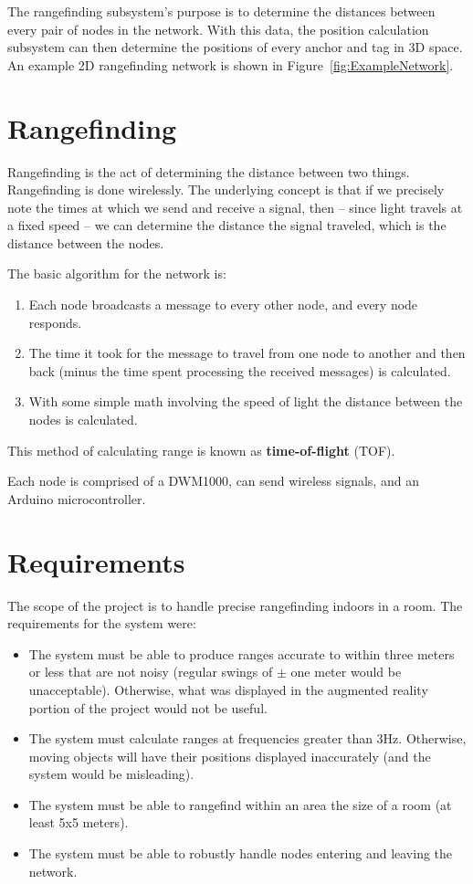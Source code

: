 The rangefinding subsystem's purpose is to determine the distances between every pair of nodes in the network. With this data, the position calculation subsystem can then determine the positions of every anchor and tag in 3D space. An example 2D rangefinding network is shown in Figure~\ref{fig:ExampleNetwork}.

\section{Rangefinding}
Rangefinding is the act of determining the distance between two things. Rangefinding is done wirelessly. The underlying concept is that if we precisely note the times at which we send and receive a signal, then -- since light travels at a fixed speed -- we can determine the distance the signal traveled, which is the distance between the nodes. 

The basic algorithm for the network is: 
\begin{enumerate}
	\item Each node broadcasts a message to every other node, and every node responds. 
	\item The time it took for the message to travel from one node to another and then back (minus the time spent processing the received messages) is calculated.
	\item With some simple math involving the speed of light the distance between the nodes is calculated. 
\end{enumerate}

This method of calculating range is known as \textbf{time-of-flight} (TOF).

Each node is comprised of a DWM1000, can send wireless signals, and an Arduino microcontroller.

\section{Requirements}
The scope of the project is to handle precise rangefinding indoors in a room. The requirements for the system were:
\begin{itemize}
	\item The system must be able to produce ranges accurate to within three meters or less that are not noisy (regular swings of $\pm$ one meter would be unacceptable). Otherwise, what was displayed in the augmented reality portion of the project would not be useful. 
	\item The system must calculate ranges at frequencies greater than 3Hz. Otherwise, moving objects will have their positions displayed inaccurately (and the system would be misleading).
	\item The system must be able to rangefind within an area the size of a room (at least 5x5 meters). 
	\item The system must be able to robustly handle nodes entering and leaving the network. 
\end{itemize}

